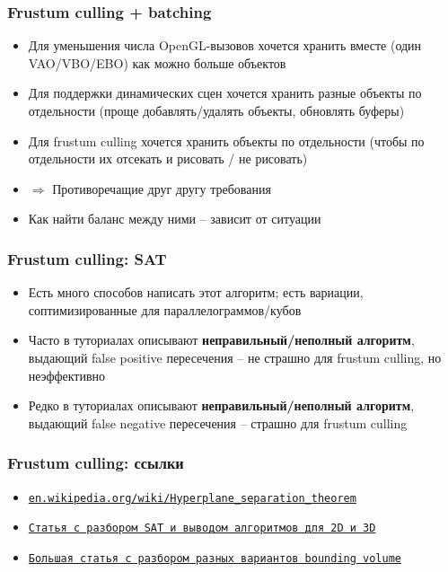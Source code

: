\documentclass{beamer}
\begin{document}
\begin{frame}[fragile]
\frametitle{Frustum culling + batching}
\begin{itemize}
\item Для уменьшения числа OpenGL-вызовов хочется хранить вместе (один VAO/VBO/EBO) как можно больше объектов
\pause
\item Для поддержки динамических сцен хочется хранить разные объекты по отдельности (проще добавлять/удалять объекты, обновлять буферы)
\pause
\item Для frustum culling хочется хранить объекты по отдельности (чтобы по отдельности их отсекать и рисовать / не рисовать)
\pause
\item \begin{math}\Longrightarrow\end{math} Противоречащие друг другу требования
\pause
\item Как найти баланс между ними -- зависит от ситуации 
\end{itemize}
\end{frame}

\begin{frame}[fragile]
\frametitle{Frustum culling: SAT}
\begin{itemize}
\item Есть много способов написать этот алгоритм; есть вариации, соптимизированные для параллелограммов/кубов
\item Часто в туториалах описывают \textbf{неправильный/неполный алгоритм}, выдающий false positive пересечения -- не страшно для frustum culling, но неэффективно
\item Редко в туториалах описывают \textbf{неправильный/неполный алгоритм}, выдающий false negative пересечения -- страшно для frustum culling
\end{itemize}
\end{frame}

\begin{frame}[fragile]
\frametitle{Frustum culling: ссылки}
\begin{footnotesize}
\begin{itemize}
\item \href{https://en.wikipedia.org/wiki/Hyperplane_separation_theorem}{\texttt{en.wikipedia.org/wiki/Hyperplane\_separation\_theorem}}
\item \href{https://www.geometrictools.com/Documentation/MethodOfSeparatingAxes.pdf}{\texttt{Статья с разбором SAT и выводом алгоритмов для 2D и 3D}}
\item \href{https://learnopengl.com/Guest-Articles/2021/Scene/Frustum-Culling}{\texttt{Большая статья с разбором разных вариантов bounding volume}}
\end{itemize}
\end{footnotesize}
\end{frame}
\end{document}
